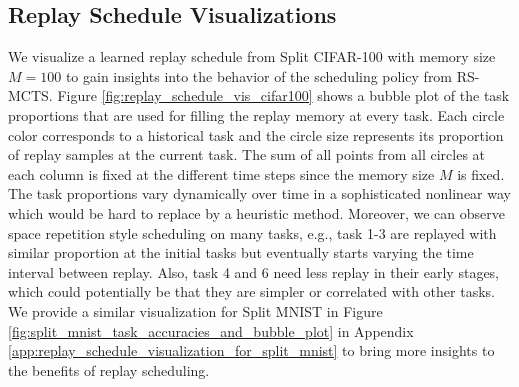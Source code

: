 
\begin{comment}
\begin{figure}[t]
  \centering
  \setlength{\figwidth}{0.46\textwidth}
  \setlength{\figheight}{.22\textheight}
  
  \vspace{-3mm}
  \caption{ Replay schedule learned from Split CIFAR-100 visualized as a bubble plot. %
  The task proportions vary dynamically over time which would be hard to replace by a heuristic method. 
  } 
  \vspace{-3mm}
  \label{fig:replay_schedule_vis_cifar100}
\end{figure}
\end{comment}



\subsection{Replay Schedule Visualizations}
\label{paperC:sec:replay_schedule_visualization}

We visualize a learned replay schedule from Split CIFAR-100 with memory size $M=100$ to gain insights into the behavior of the scheduling policy from RS-MCTS. Figure \ref{fig:replay_schedule_vis_cifar100} shows a bubble plot of the task proportions that are used for filling the replay memory at every task. 
Each circle color corresponds to a historical task and the circle size represents its proportion of replay samples at the current task.
The sum of all points from all circles at each column is fixed at the different time steps since the memory size $M$ is fixed. The task proportions vary dynamically over time in a sophisticated nonlinear way which would be hard to replace by a heuristic method. Moreover, we can observe space repetition style scheduling on many tasks, e.g., task 1-3 are replayed with similar proportion at the initial tasks but eventually starts varying the time interval between replay. Also, task 4 and 6 need less replay in their early stages, which could potentially be that they are simpler or correlated with other tasks. We provide a similar visualization for Split MNIST in Figure \ref{fig:split_mnist_task_accuracies_and_bubble_plot} in Appendix \ref{app:replay_schedule_visualization_for_split_mnist} to bring more insights to the benefits of replay scheduling. %




